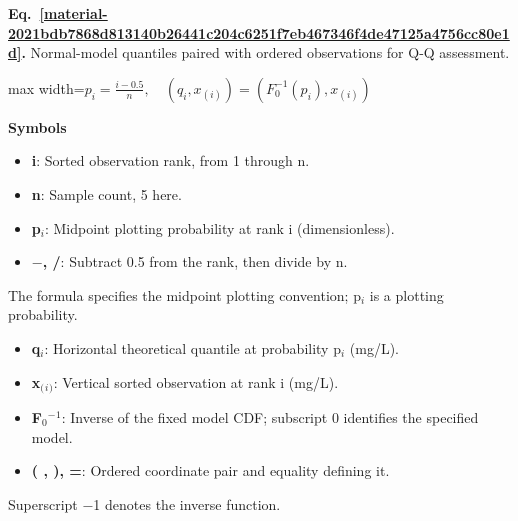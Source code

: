 \documentclass[11pt,a4paper]{article}
\begin{document}
\par\medskip
\begin{samepage}
\label{material-2021bdb7868d813140b26441c204c6251f7eb467346f4de47125a4756cc80e1d}
\noindent\textbf{Eq.~\ref*{material-2021bdb7868d813140b26441c204c6251f7eb467346f4de47125a4756cc80e1d}.} Normal-model quantiles paired with ordered observations for Q-Q assessment.\par\nopagebreak
\begin{center}\begin{adjustbox}{max width=\linewidth}$\displaystyle p_i=\frac{i-0.5}{n},\quad (q_i,x_{(i)})=(F_0^{-1}(p_i),x_{(i)})$\end{adjustbox}\end{center}

\par\noindent\textbf{Symbols}

\begin{itemize}\setlength{\itemsep}{1pt}\setlength{\parsep}{0pt}
\item \textbf{i}: Sorted observation rank, from 1 through n.
\item \textbf{n}: Sample count, 5 here.
\item \textbf{p\ensuremath{{}_i}}: Midpoint plotting probability at rank i (dimensionless).
\item \textbf{\ensuremath{-}, /}: Subtract 0.5 from the rank, then divide by n.
\end{itemize}

The formula specifies the midpoint plotting convention; p\ensuremath{{}_i} is a plotting probability.

\begin{itemize}\setlength{\itemsep}{1pt}\setlength{\parsep}{0pt}
\item \textbf{q\ensuremath{{}_i}}: Horizontal theoretical quantile at probability p\ensuremath{{}_i} (mg/L).
\item \textbf{x\ensuremath{{}_{(}}\ensuremath{{}_i}\ensuremath{{}_{)}}}: Vertical sorted observation at rank i (mg/L).
\item \textbf{F\ensuremath{{}_0}\ensuremath{{}^-}\ensuremath{{}^1}}: Inverse of the fixed model CDF; subscript 0 identifies the specified model.
\item \textbf{( , ), =}: Ordered coordinate pair and equality defining it.
\end{itemize}

Superscript \ensuremath{-}1 denotes the inverse function.

\end{samepage}
\medskip
\end{document}
